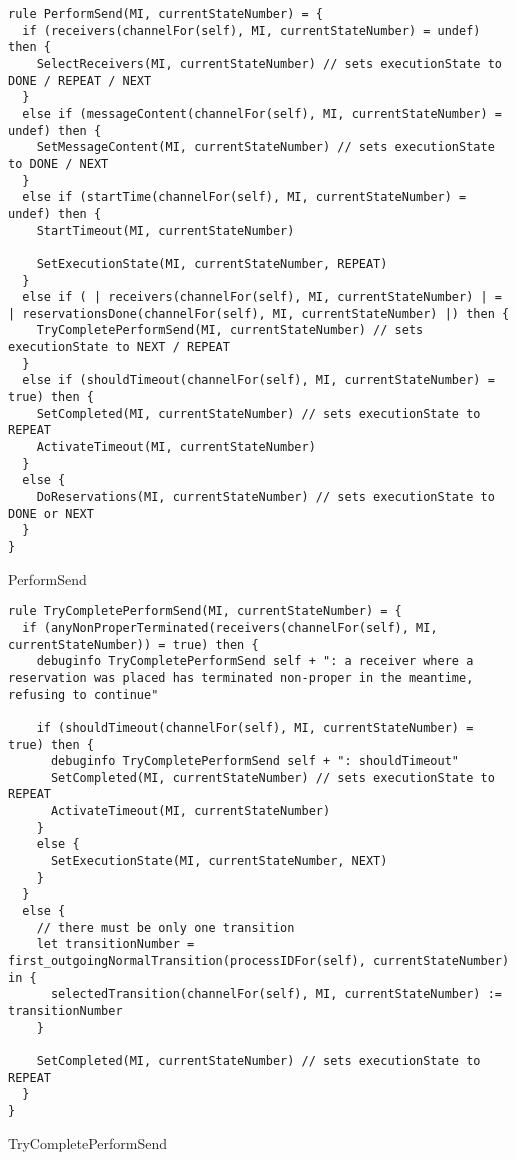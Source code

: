 \begin{listing}[H]
\begin{verbatim}
rule PerformSend(MI, currentStateNumber) = {
  if (receivers(channelFor(self), MI, currentStateNumber) = undef) then {
    SelectReceivers(MI, currentStateNumber) // sets executionState to DONE / REPEAT / NEXT
  }
  else if (messageContent(channelFor(self), MI, currentStateNumber) = undef) then {
    SetMessageContent(MI, currentStateNumber) // sets executionState to DONE / NEXT
  }
  else if (startTime(channelFor(self), MI, currentStateNumber) = undef) then {
    StartTimeout(MI, currentStateNumber)

    SetExecutionState(MI, currentStateNumber, REPEAT)
  }
  else if ( | receivers(channelFor(self), MI, currentStateNumber) | = | reservationsDone(channelFor(self), MI, currentStateNumber) |) then {
    TryCompletePerformSend(MI, currentStateNumber) // sets executionState to NEXT / REPEAT
  }
  else if (shouldTimeout(channelFor(self), MI, currentStateNumber) = true) then {
    SetCompleted(MI, currentStateNumber) // sets executionState to REPEAT
    ActivateTimeout(MI, currentStateNumber)
  }
  else {
    DoReservations(MI, currentStateNumber) // sets executionState to DONE or NEXT
  }
}
\end{verbatim}
\caption{PerformSend}
\label{lst:asm:PerformSend}
\end{listing}




\begin{listing}[H]
\begin{verbatim}
rule TryCompletePerformSend(MI, currentStateNumber) = {
  if (anyNonProperTerminated(receivers(channelFor(self), MI, currentStateNumber)) = true) then {
    debuginfo TryCompletePerformSend self + ": a receiver where a reservation was placed has terminated non-proper in the meantime, refusing to continue"

    if (shouldTimeout(channelFor(self), MI, currentStateNumber) = true) then {
      debuginfo TryCompletePerformSend self + ": shouldTimeout"
      SetCompleted(MI, currentStateNumber) // sets executionState to REPEAT
      ActivateTimeout(MI, currentStateNumber)
    }
    else {
      SetExecutionState(MI, currentStateNumber, NEXT)
    }
  }
  else {
    // there must be only one transition
    let transitionNumber = first_outgoingNormalTransition(processIDFor(self), currentStateNumber) in {
      selectedTransition(channelFor(self), MI, currentStateNumber) := transitionNumber
    }

    SetCompleted(MI, currentStateNumber) // sets executionState to REPEAT
  }
}
\end{verbatim}
\caption{TryCompletePerformSend}
\label{lst:asm:TryCompletePerformSend}
\end{listing}




